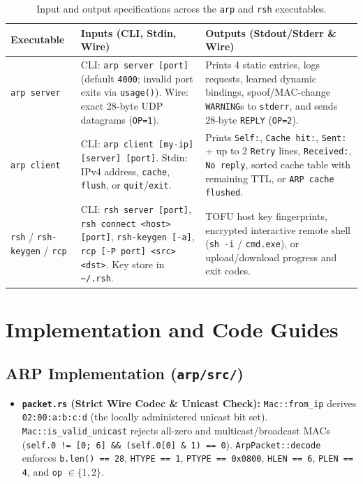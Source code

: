 \documentclass[11pt,a4paper]{article}
\begin{document}
\begin{table}[H]
\centering
\small
\begin{tabularx}{\textwidth}{@{}p{2.3cm} X X@{}}
\toprule
\textbf{Executable} & \textbf{Inputs (CLI, Stdin, Wire)} & \textbf{Outputs (Stdout/Stderr \& Wire)} \\
\midrule
\texttt{arp server} &
CLI: \texttt{arp server [port]} (default \texttt{4000}; invalid port exits via \texttt{usage()}). Wire: exact 28-byte UDP datagrams (\texttt{OP=1}). &
Prints 4 static entries, logs requests, learned dynamic bindings, spoof/MAC-change \texttt{WARNING}s to \texttt{stderr}, and sends 28-byte \texttt{REPLY} (\texttt{OP=2}). \\
\texttt{arp client} &
CLI: \texttt{arp client [my-ip] [server] [port]}. Stdin: IPv4 address, \texttt{cache}, \texttt{flush}, or \texttt{quit}/\texttt{exit}. &
Prints \texttt{Self:}, \texttt{Cache hit:}, \texttt{Sent:} + up to 2 \texttt{Retry} lines, \texttt{Received:}, \texttt{No reply}, sorted cache table with remaining TTL, or \texttt{ARP cache flushed}. \\
\texttt{rsh} / \texttt{rsh-keygen} / \texttt{rcp} &
CLI: \texttt{rsh server [port]}, \texttt{rsh connect <host> [port]}, \texttt{rsh-keygen [-a]}, \texttt{rcp [-P port] <src> <dst>}. Key store in \texttt{\textasciitilde/.rsh}. &
TOFU host key fingerprints, encrypted interactive remote shell (\texttt{sh -i} / \texttt{cmd.exe}), or upload/download progress and exit codes. \\
\bottomrule
\end{tabularx}
\caption{Input and output specifications across the \texttt{arp} and \texttt{rsh} executables.}
\label{tab:io}
\end{table}

\section{Implementation and Code Guides}

\subsection{ARP Implementation (\texttt{arp/src/})}
\begin{itemize}
  \item \textbf{\texttt{packet.rs} (Strict Wire Codec \& Unicast Check):} \texttt{Mac::from\_ip} derives \texttt{02:00:a:b:c:d} (the locally administered unicast bit set). \texttt{Mac::is\_valid\_unicast} rejects all-zero and multicast/broadcast MACs (\texttt{self.0 != [0; 6] \&\& (self.0[0] \& 1) == 0}). \texttt{ArpPacket::decode} enforces \texttt{b.len() == 28}, \texttt{HTYPE == 1}, \texttt{PTYPE == 0x0800}, \texttt{HLEN == 6}, \texttt{PLEN == 4}, and \texttt{op} $\in \{1, 2\}$.
\end{itemize}
\end{document}
